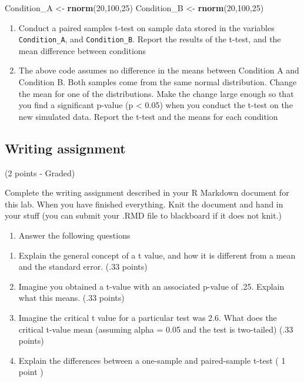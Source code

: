 \documentclass[
]{book}
\newenvironment{Shaded}{\begin{snugshade}}{\end{snugshade}}
\newcommand{\DecValTok}[1]{\textcolor[rgb]{0.00,0.00,0.81}{#1}}
\newcommand{\FunctionTok}[1]{\textcolor[rgb]{0.13,0.29,0.53}{\textbf{#1}}}
\newcommand{\NormalTok}[1]{#1}
\newcommand{\OtherTok}[1]{\textcolor[rgb]{0.56,0.35,0.01}{#1}}
\providecommand{\tightlist}{%
  \setlength{\itemsep}{0pt}\setlength{\parskip}{0pt}}
\begin{document}
\begin{Shaded}
\begin{Highlighting}[]
\NormalTok{Condition\_A }\OtherTok{\textless{}{-}} \FunctionTok{rnorm}\NormalTok{(}\DecValTok{20}\NormalTok{,}\DecValTok{100}\NormalTok{,}\DecValTok{25}\NormalTok{)}
\NormalTok{Condition\_B }\OtherTok{\textless{}{-}} \FunctionTok{rnorm}\NormalTok{(}\DecValTok{20}\NormalTok{,}\DecValTok{100}\NormalTok{,}\DecValTok{25}\NormalTok{)}
\end{Highlighting}
\end{Shaded}

\begin{enumerate}
\def\labelenumi{\arabic{enumi}.}
\item
  Conduct a paired samples t-test on sample data stored in the variables \texttt{Condition\_A}, and \texttt{Condition\_B}. Report the results of the t-test, and the mean difference between conditions
\item
  The above code assumes no difference in the means between Condition A and Condition B. Both samples come from the same normal distribution. Change the mean for one of the distributions. Make the change large enough so that you find a significant p-value (p \textless{} 0.05) when you conduct the t-test on the new simulated data. Report the t-test and the means for each condition
\end{enumerate}

\hypertarget{writing-assignment-5}{%
\subsection{Writing assignment}\label{writing-assignment-5}}

(2 points - Graded)

Complete the writing assignment described in your R Markdown document for this lab. When you have finished everything. Knit the document and hand in your stuff (you can submit your .RMD file to blackboard if it does not knit.)

\begin{enumerate}
\def\labelenumi{\arabic{enumi}.}
\tightlist
\item
  Answer the following questions
\end{enumerate}

\begin{enumerate}
\def\labelenumi{\alph{enumi}.}
\item
  Explain the general concept of a t value, and how it is different from a mean and the standard error. (.33 points)
\item
  Imagine you obtained a t-value with an associated p-value of .25. Explain what this means. (.33 points)
\item
  Imagine the critical t value for a particular test was 2.6. What does the critical t-value mean (assuming alpha = 0.05 and the test is two-tailed) (.33 points)
\item
  Explain the differences between a one-sample and paired-sample t-test ( 1 point )
\end{enumerate}
\end{document}
